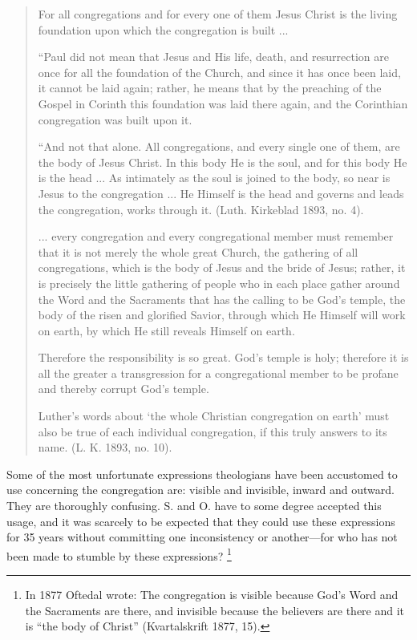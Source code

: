 \begin{quote}
For all congregations and for every one of them Jesus Christ is the living foundation upon which the congregation is built ...

“Paul did not mean that Jesus and His life, death, and resurrection are once for all the foundation of the Church, and since it has once been laid, it cannot be laid again; rather, he means that by the preaching of the Gospel in Corinth this foundation was laid there again, and the Corinthian congregation was built upon it.

“And not that alone. All congregations, and every single one of them, are the body of Jesus Christ. In this body He is the soul, and for this body He is the head ... As intimately as the soul is joined to the body, so near is Jesus to the congregation ... He Himself is the head and governs and leads the congregation, works through it. (Luth. Kirkeblad 1893, no. 4).

... every congregation and every congregational member must remember that it is not merely the whole great Church, the gathering of all congregations, which is the body of Jesus and the bride of Jesus; rather, it is precisely the little gathering of people who in each place gather around the Word and the Sacraments that has the calling to be God’s temple, the body of the risen and glorified Savior, through which He Himself will work on earth, by which He still reveals Himself on earth.

Therefore the responsibility is so great. God’s temple is holy; therefore it is all the greater a transgression for a congregational member to be profane and thereby corrupt God’s temple.

Luther’s words about ‘the whole Christian congregation on earth’ must also be true of each individual congregation, if this truly answers to its name. (L. K. 1893, no. 10).









\end{quote}

Some of the most unfortunate expressions theologians have been accustomed to use concerning the congregation are: visible and invisible, inward and outward. They are thoroughly confusing. S. and O. have to some degree accepted this usage, and it was scarcely to be expected that they could use these expressions for 35 years without committing one inconsistency or another—for who has not been made to stumble by these expressions? \footnote{In 1877 Oftedal wrote: The congregation is visible because God’s Word and the Sacraments are there, and invisible because the believers are there and it is “the body of Christ” (Kvartalskrift 1877, 15).}

